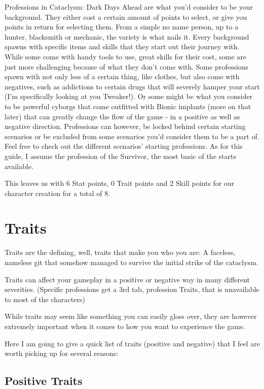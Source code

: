Professions in Cataclysm: Dark Days Ahead are what you'd consider to be your background. They either cost a certain amount of points to select, or give you points in return for selecting them. From a simple no name person, up to a hunter, blacksmith or mechanic, the variety is what nails it. Every background spawns with specific items and skills that they start out their journey with. While some come with handy tools to use, great skills for their cost, some are just more challenging because of what they don't come with. Some professions spawn with not only less of a certain thing, like clothes, but also come with negatives, such as addictions to certain drugs that will severely hamper your start (I'm specifically looking at you Tweaker!). Or some might be what you consider to be powerful cyborgs that come outfitted with Bionic implants (more on that later) that can greatly change the flow of the game - in a positive as well as negative direction. Professions can however, be locked behind certain starting scenarios or be excluded from some scenarios you'd consider them to be a part of. Feel free to check out the different scenarios' starting professions. As for this guide, I assume the profession of the Survivor, the most basic of the starts available.

This leaves us with 6 Stat points, 0 Trait points and 2 Skill points for our character creation for a total of 8.

\section{Traits}

Traits are the defining, well, traits that make you who you are: A faceless, nameless git that somehow managed to survive the initial strike of the cataclysm.

Traits can affect your gameplay in a positive or negative way in many different severities. (Specific professions get a 3rd tab, profession Traits, that is unavailable to most of the characters)

While traits may seem like something you can easily gloss over, they are however extremely important when it comes to how you want to experience the game.

Here I am going to give a quick list of traits (positive and negative) that I feel are worth picking up for several reasons:

\subsection{Positive Traits}

